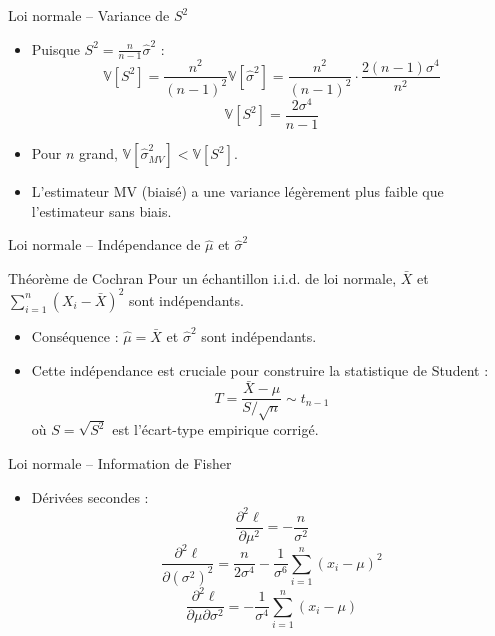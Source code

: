 \documentclass[11pt,aspectratio=169]{beamer}
\begin{document}
\begin{frame}{Loi normale -- Variance de $S^2$}

\begin{itemize}

\item Puisque $S^2 = \frac{n}{n-1}\hat{\sigma}^2$ :
  \[
  \mathbb{V}[S^2] = \frac{n^2}{(n-1)^2}\mathbb{V}[\hat{\sigma}^2] = \frac{n^2}{(n-1)^2} \cdot \frac{2(n-1)\sigma^4}{n^2}
  \]
  \[
  \boxed{\mathbb{V}[S^2] = \frac{2\sigma^4}{n-1}}
  \]

\item Pour $n$ grand, $\mathbb{V}[\hat{\sigma}^2_{MV}] < \mathbb{V}[S^2]$.\newline

\item L'estimateur MV (biaisé) a une variance légèrement plus faible que l'estimateur sans biais.

\end{itemize}

\end{frame}

\begin{frame}{Loi normale -- Indépendance de $\hat{\mu}$ et $\hat{\sigma}^2$}

\begin{alertblock}{Théorème de Cochran}
Pour un échantillon i.i.d. de loi normale, $\bar{X}$ et $\sum_{i=1}^n(X_i - \bar{X})^2$ sont indépendants.
\end{alertblock}

\begin{itemize}

\item Conséquence : $\hat{\mu} = \bar{X}$ et $\hat{\sigma}^2$ sont indépendants.\newline

\item Cette indépendance est cruciale pour construire la statistique de Student :
  \[
  T = \frac{\bar{X} - \mu}{S/\sqrt{n}} \sim t_{n-1}
  \]
  où $S = \sqrt{S^2}$ est l'écart-type empirique corrigé.

\end{itemize}

\end{frame}

\begin{frame}{Loi normale -- Information de Fisher}

\begin{itemize}

\item Dérivées secondes :
  \[
  \frac{\partial^2 \ell}{\partial \mu^2} = -\frac{n}{\sigma^2}
  \]
  \[
  \frac{\partial^2 \ell}{\partial (\sigma^2)^2} = \frac{n}{2\sigma^4} - \frac{1}{\sigma^6}\sum_{i=1}^n(x_i - \mu)^2
  \]
  \[
  \frac{\partial^2 \ell}{\partial \mu \partial \sigma^2} = -\frac{1}{\sigma^4}\sum_{i=1}^n(x_i - \mu)
  \]

\end{itemize}

\end{frame}
\end{document}
